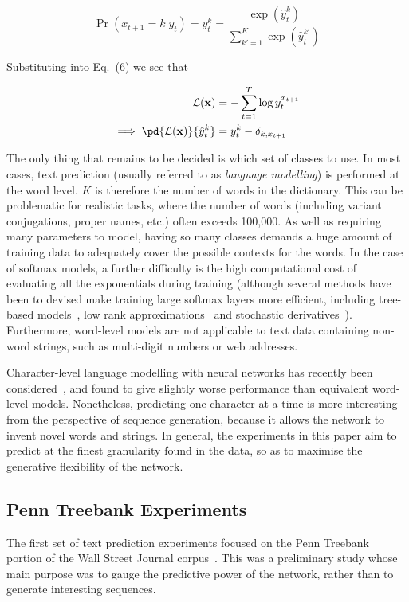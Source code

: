 \begin{equation}
\label{eq:softmax}
\Pr(x_{t+1}=k|y_t) = y^k_t = \frac{\exp\left(\hat{y}^k_t\right)}{\sum_{k'=1}^K{\exp\left(\hat{y}^{k'}_{t}\right)}}
\end{equation}

Substituting into Eq.~(6) we see that

\begin{align}
\mathcal{L}(\mathbf{x}) &= -\sum_{t=1}^T{\log y^{x_{t+1}}_t}\\
\implies \pd{\mathcal{L}(\mathbf{x})}{\hat{y}^k_t} &= y^k_t - \delta_{k,x_{t+1}}	
\end{align}

The only thing that remains to be decided is which set of classes to use. In most cases, text prediction (usually referred to as \emph{language modelling}) is performed at the word level. $K$ is therefore the number of words in the dictionary. This can be problematic for realistic tasks, where the number of words (including variant conjugations, proper names, etc.) often exceeds 100,000. As well as requiring many parameters to model, having so many classes demands a huge amount of training data to adequately cover the possible contexts for the words. In the case of softmax models, a further difficulty is the high computational cost of evaluating all the exponentials during training (although several methods have been to devised make training large softmax layers more efficient, including tree-based models~\cite{mnih08tree,mikolov12thesis}, low rank approximations~\cite{sainath13rank} and stochastic derivatives~\cite{mnih12noise}). Furthermore, word-level models are not applicable to text data containing non-word strings, such as multi-digit numbers or web addresses. 

Character-level language modelling with neural networks has recently been considered~\cite{sutskever11rnn,mikolov12subword}, and found to give slightly worse performance than equivalent word-level models. Nonetheless, predicting one character at a time is more interesting from the perspective of sequence generation, because it allows the network to invent novel words and strings. In general, the experiments in this paper aim to predict at the finest granularity found in the data, so as to maximise the generative flexibility of the network.

\subsection{Penn Treebank Experiments} The first set of text prediction experiments focused on the Penn Treebank portion of the Wall Street Journal corpus~\cite{penn}. This was a preliminary study whose main purpose was to gauge the predictive power of the network, rather than to generate interesting sequences.


